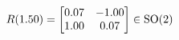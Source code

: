 \documentclass[preview]{standalone}
\begin{document}
\begin{align*}
\special{dvisvgm:raw <g id='unique000'>}R(1.50) = \begin{bmatrix} 0.07 & -1.00 \\ 1.00 & 0.07 \end{bmatrix} \in \text{SO}(2)\special{dvisvgm:raw </g>}
\end{align*}
\end{document}
